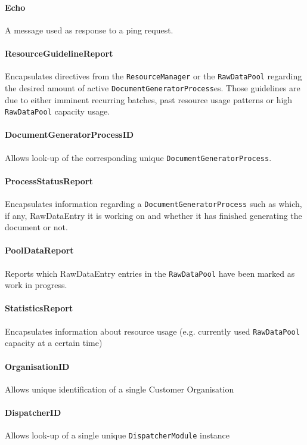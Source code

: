 \documentclass[a4paper,10pt]{article}
\begin{document}
\paragraph{Echo} A message used as response to a ping request.

\paragraph{ResourceGuidelineReport} Encapsulates directives from the \texttt{ResourceManager} or the \texttt{RawDataPool} regarding the desired amount of active \texttt{DocumentGeneratorProcess}es. Those guidelines are due to either imminent recurring batches, past resource usage patterns or high \texttt{RawDataPool} capacity usage.

\paragraph{DocumentGeneratorProcessID} Allows look-up of the corresponding unique \texttt{DocumentGeneratorProcess}.

\paragraph{ProcessStatusReport} Encapsulates information regarding a \texttt{DocumentGeneratorProcess} such as which, if any, RawDataEntry it is working on and whether it has finished generating the document or not.

\paragraph{PoolDataReport} Reports which RawDataEntry entries in the \texttt{RawDataPool} have been marked as work in progress.

\paragraph{StatisticsReport} Encapsulates information about resource usage (e.g. currently used \texttt{RawDataPool} capacity at a certain time)

\paragraph{OrganisationID} Allows unique identification of a single Customer Organisation

\paragraph{DispatcherID} Allows look-up of a single unique \texttt{DispatcherModule} instance
\end{document}
